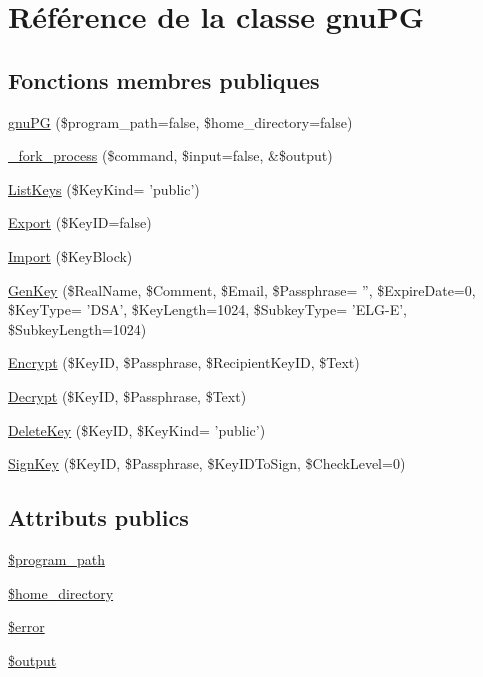 \hypertarget{classgnuPG}{
\section{R\'{e}f\'{e}rence de la classe gnu\-PG}
\label{classgnuPG}
}
\subsection*{Fonctions membres publiques}
\begin{CompactItemize}
\item 
\hyperlink{classgnuPG_a0}{gnu\-PG} (\$program\_\-path=false, \$home\_\-directory=false)
\item 
\hyperlink{classgnuPG_a1}{\_\-fork\_\-process} (\$command, \$input=false, \&\$output)
\item 
\hyperlink{classgnuPG_a2}{List\-Keys} (\$Key\-Kind= 'public')
\item 
\hyperlink{classgnuPG_a3}{Export} (\$Key\-ID=false)
\item 
\hyperlink{classgnuPG_a4}{Import} (\$Key\-Block)
\item 
\hyperlink{classgnuPG_a5}{Gen\-Key} (\$Real\-Name, \$Comment, \$Email, \$Passphrase= '', \$Expire\-Date=0, \$Key\-Type= 'DSA', \$Key\-Length=1024, \$Subkey\-Type= 'ELG-E', \$Subkey\-Length=1024)
\item 
\hyperlink{classgnuPG_a6}{Encrypt} (\$Key\-ID, \$Passphrase, \$Recipient\-Key\-ID, \$Text)
\item 
\hyperlink{classgnuPG_a7}{Decrypt} (\$Key\-ID, \$Passphrase, \$Text)
\item 
\hyperlink{classgnuPG_a8}{Delete\-Key} (\$Key\-ID, \$Key\-Kind= 'public')
\item 
\hyperlink{classgnuPG_a9}{Sign\-Key} (\$Key\-ID, \$Passphrase, \$Key\-IDTo\-Sign, \$Check\-Level=0)
\end{CompactItemize}
\subsection*{Attributs publics}
\begin{CompactItemize}
\item 
\hyperlink{classgnuPG_o0}{\$program\_\-path}
\item 
\hyperlink{classgnuPG_o1}{\$home\_\-directory}
\item 
\hyperlink{classgnuPG_o2}{\$error}
\item 
\hyperlink{classgnuPG_o3}{\$output}
\end{CompactItemize}



